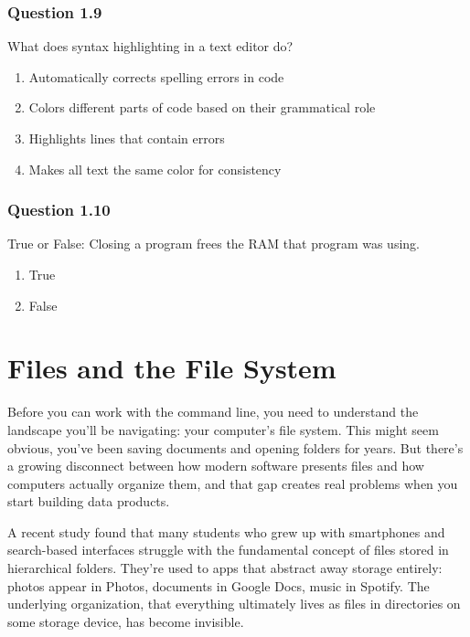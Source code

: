 \documentclass[
  letterpaper,
  DIV=11,
  numbers=noendperiod]{scrreprt}
\providecommand{\tightlist}{%
  \setlength{\itemsep}{0pt}\setlength{\parskip}{0pt}}
\begin{document}
\subsection{Question 1.9}\label{question-1.9}

What does syntax highlighting in a text editor do?

\begin{enumerate}
\def\labelenumi{\Alph{enumi})}
\tightlist
\item
  Automatically corrects spelling errors in code\\
\item
  Colors different parts of code based on their grammatical role\\
\item
  Highlights lines that contain errors\\
\item
  Makes all text the same color for consistency
\end{enumerate}

\subsection{Question 1.10}\label{question-1.10}

True or False: Closing a program frees the RAM that program was using.

\begin{enumerate}
\def\labelenumi{\Alph{enumi})}
\tightlist
\item
  True\\
\item
  False
\end{enumerate}

\chapter{Files and the File System}\label{sec-files}

Before you can work with the command line, you need to understand the
landscape you'll be navigating: your computer's file system. This might
seem obvious, you've been saving documents and opening folders for
years. But there's a growing disconnect between how modern software
presents files and how computers actually organize them, and that gap
creates real problems when you start building data products.

A recent study found that many students who grew up with smartphones and
search-based interfaces struggle with the fundamental concept of files
stored in hierarchical folders. They're used to apps that abstract away
storage entirely: photos appear in Photos, documents in Google Docs,
music in Spotify. The underlying organization, that everything
ultimately lives as files in directories on some storage device, has
become invisible.
\end{document}
